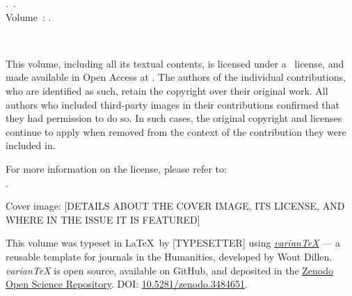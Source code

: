 \null\vfill\small
\noindent\thejournal.~\thejournalsubtitle. \\ 
\noindent Volume~\thevolume: \thevolumetitle. \\ \par
\noindent\doclicenseIcon \ \theyear \\ \par 
\noindent This volume, including all its textual contents, is licensed under a \doclicenseLongNameRef \ license, and made available in Open Access at \href{\thewebsite}{\thewebsite}. The authors of the individual contributions, who are identified as such, retain the copyright over their original work.  All authors who included third-party images in their contributions confirmed that they had permission to do so. In such cases, the original copyright and licenses continue to apply when removed from the context of the contribution they were included in. \\ \par

\noindent For more information on the \doclicenseNameRef license, please refer to: \\ \doclicenseURL.  \\ \par

\noindent Cover image: [DETAILS ABOUT THE COVER IMAGE, ITS LICENSE, AND WHERE IN THE ISSUE IT IS FEATURED] \\ \par

\noindent This volume was typeset in \LaTeX~by [TYPESETTER] using \emph{\href{https://variantex.woutdillen.be}{varianTeX}} --- a reusable template for journals in the Humanities, developed by Wout Dillen. \emph{varianTeX} is open source, available on GitHub, and deposited in the \href{https://about.zenodo.org}{Zenodo Open Science Repository}. DOI: \href{https://zenodo.org/record/3484651#.X0PdDy2w3kI}{10.5281/zenodo.3484651}.  
\newpage